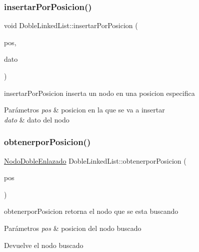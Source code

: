 \subsubsection{\texorpdfstring{insertar\+Por\+Posicion()}{insertarPorPosicion()}}
{\footnotesize\ttfamily void Doble\+Linked\+List\+::insertar\+Por\+Posicion (\begin{DoxyParamCaption}\item[{int}]{pos,  }\item[{Q\+String}]{dato }\end{DoxyParamCaption})\hspace{0.3cm}{\ttfamily [inline]}}



insertar\+Por\+Posicion inserta un nodo en una posicion especifica 


\begin{DoxyParams}{Parámetros}
{\em pos} & posicion en la que se va a insertar \\
\hline
{\em dato} & dato del nodo \\
\hline
\end{DoxyParams}
\mbox{\label{class_doble_linked_list_a8a62559b4da97d6de2d9d06a5ce955ab}} 
\subsubsection{\texorpdfstring{obtenerpor\+Posicion()}{obtenerporPosicion()}}
{\footnotesize\ttfamily \mbox{\hyperlink{class_nodo_doble_enlazado}{Nodo\+Doble\+Enlazado}} Doble\+Linked\+List\+::obtenerpor\+Posicion (\begin{DoxyParamCaption}\item[{int}]{pos }\end{DoxyParamCaption})\hspace{0.3cm}{\ttfamily [inline]}}



obtenerpor\+Posicion retorna el nodo que se esta buscando 


\begin{DoxyParams}{Parámetros}
{\em pos} & posicion del nodo buscado \\
\hline
\end{DoxyParams}
\begin{DoxyReturn}{Devuelve}
el nodo buscado 
\end{DoxyReturn}


